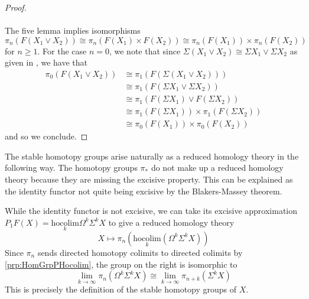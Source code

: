 \begin{thm}
\begin{proof}
{} \\~\\
The five lemma implies isomorphisms $\pi_n(F(X_1\vee X_2))\cong\pi_n(F(X_1)\times F(X_2))\cong\pi_n(F(X_1))\times\pi_n(F(X_2))$ for $n\geq 1$. For the case $n=0$, we note that since $\Sigma (X_1\vee X_2)\cong\Sigma X_1\vee\Sigma X_2$ as given in \cite{AT}, we have that 
\begin{align*}
\pi_0(F(X_1\vee X_2))&\cong\pi_1(F(\Sigma(X_1\vee X_2)))\\
&\cong\pi_1(F(\Sigma X_1\vee\Sigma X_2))\\
&\cong\pi_1(F(\Sigma X_1)\vee F(\Sigma X_2))\\
&\cong\pi_1(F(\Sigma X_1))\times\pi_1(F(\Sigma X_2))\\
&\cong\pi_0(F(X_1))\times\pi_0(F(X_2))
\end{align*} and so we conclude. 
\end{proof}
\end{thm}

\begin{eg}\label{eg:SHG} The stable homotopy groups arise naturally as a reduced homology theory in the following way. The homotopy groups $\pi_\ast$ do not make up a reduced homology theory because they are missing the excisive property. This can be explained as the identity functor not quite being excisive by the Blakers-Massey theorem. 

While the identity functor is not excisive, we can take its excisive approximation $P_1F(X)=\underset{k}{\text{hocolim}}\Omega^k\Sigma^k X$ to give a reduced homology theory $$X\mapsto\pi_n(\underset{k}{\text{hocolim}}(\Omega^k\Sigma^kX))$$ Since $\pi_n$ sends directed homotopy colimits to directed colimits by \ref{prp:HomGrpPHocolim}, the group on the right is isomorphic to $$\lim_{k\to\infty}\pi_n(\Omega^k\Sigma^k X)\cong\lim_{k\to\infty}\pi_{n+k}(\Sigma^k X)$$ This is precisely the definition of the stable homotopy groups of $X$. 
\end{eg}

